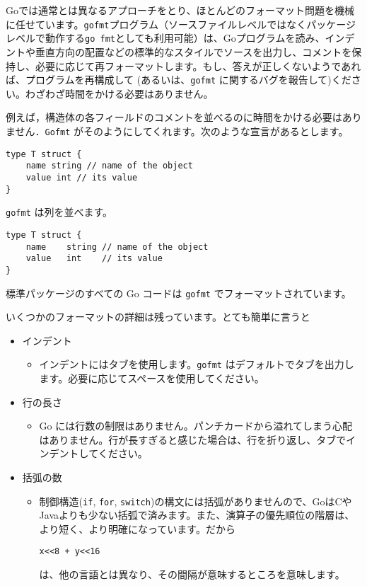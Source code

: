 \documentclass{jsarticle}
\begin{document}
Goでは通常とは異なるアプローチをとり、ほとんどのフォーマット問題を機械に任せています。\texttt{gofmt}プログラム（ソースファイルレベルではなくパッケージレベルで動作する\texttt{go\ fmt}としても利用可能）は、Goプログラムを読み、インデントや垂直方向の配置などの標準的なスタイルでソースを出力し、コメントを保持し、必要に応じて再フォーマットします。もし、答えが正しくないようであれば、プログラムを再構成して
(あるいは、\texttt{gofmt}
に関するバグを報告して)ください。わざわざ時間をかける必要はありません。

例えば，構造体の各フィールドのコメントを並べるのに時間をかける必要はありません．\texttt{Gofmt}
がそのようにしてくれます。次のような宣言があるとします。

\begin{lstlisting}[numbers=none]
type T struct {
    name string // name of the object
    value int // its value
}
\end{lstlisting}

\texttt{gofmt} は列を並べます。

\begin{lstlisting}[numbers=none]
type T struct {
    name    string // name of the object
    value   int    // its value
}
\end{lstlisting}

標準パッケージのすべての Go コードは \texttt{gofmt}
でフォーマットされています。

いくつかのフォーマットの詳細は残っています。とても簡単に言うと

\begin{itemize}
\item
  インデント

  \begin{itemize}
  \item
    インデントにはタブを使用します。\texttt{gofmt}
    はデフォルトでタブを出力します。必要に応じてスペースを使用してください。
  \end{itemize}
\item
  行の長さ

  \begin{itemize}
  \item
    Go
    には行数の制限はありません。パンチカードから溢れてしまう心配はありません。行が長すぎると感じた場合は、行を折り返し、タブでインデントしてください。
  \end{itemize}
\item
  括弧の数

  \begin{itemize}
  \item
    制御構造(\texttt{if}, \texttt{for},
    \texttt{switch})の構文には括弧がありませんので、GoはCやJavaよりも少ない括弧で済みます。また、演算子の優先順位の階層は、より短く、より明確になっています。だから

\begin{lstlisting}[numbers=none]
x<<8 + y<<16
\end{lstlisting}

    は、他の言語とは異なり、その間隔が意味するところを意味します。
  \end{itemize}
\end{itemize}
\end{document}
